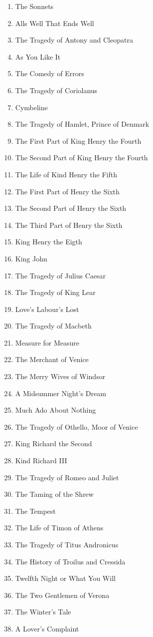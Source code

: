 \begin{enumerate}
  \item The Sonnets
  \item Alls Well That Ends Well
  \item The Tragedy of Antony and Cleopatra
  \item As You Like It
  \item The Comedy of Errors
  \item The Tragedy of Coriolanus
  \item Cymbeline
  \item The Tragedy of Hamlet, Prince of Denmark
  \item The First Part of King Henry the Fourth
  \item The Second Part of King Henry the Fourth
  \item The Life of Kind Henry the Fifth
  \item The First Part of Henry the Sixth
  \item The Second Part of Henry the Sixth
  \item The Third Part of Henry the Sixth
  \item King Henry the Eigth
  \item King John
  \item The Tragedy of Julius Caesar
  \item The Tragedy of King Lear
  \item Love's Labour's Lost
  \item The Tragedy of Macbeth
  \item Measure for Measure
  \item The Merchant of Venice
  \item The Merry Wives of Windsor
  \item A Midsummer Night's Dream
  \item Much Ado About Nothing
  \item The Tragedy of Othello, Moor of Venice
  \item King Richard the Second
  \item Kind Richard III
  \item The Tragedy of Romeo and Juliet
  \item The Taming of the Shrew
  \item The Tempest
  \item The Life of Timon of Athens
  \item The Tragedy of Titus Andronicus
  \item The History of Troilus and Cressida
  \item Twelfth Night or What You Will
  \item The Two Gentlemen of Verona
  \item The Winter's Tale
  \item A Lover's Complaint
\end{enumerate}


